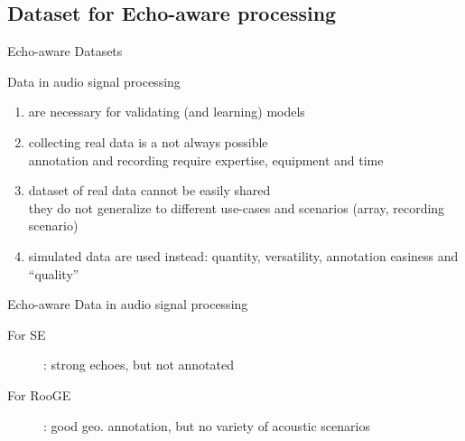 \subsection{Dataset for Echo-aware processing}

\begin{frame}{Echo-aware Datasets}

    \begin{block}{\alert{Data} in audio signal processing}
        \begin{enumerate}
            \item are necessary for validating (and learning) models
            \item collecting real data is a not always possible
            \\\hspace{.3em} annotation and recording require expertise, equipment and \alert{time}
            \item dataset of real data cannot be easily shared
            \\\hspace{.3em} they do not generalize to different use-cases and scenarios (array, recording scenario)
            \item \alert{simulated data} are used instead: quantity, versatility, annotation easiness and ``quality''
        \end{enumerate}
    \end{block}

    \begin{block}{\alert{Echo-aware Data} in audio signal processing}
        \begin{description}
            \item[For SE]: strong echoes, but not annotated
            \\\cite{a,b,c}
            \item[For RooGE]: good geo. annotation, but no variety of acoustic scenarios
            \\\cite{Crocco,Dokmaninc,Remaggi}
        \end{description}
    \end{block}

\end{frame}

\subsection{\dechorate}


